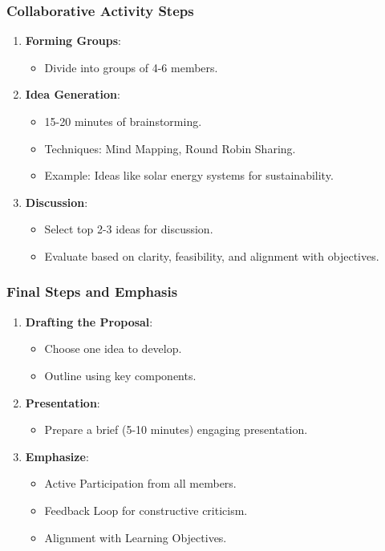 \documentclass[aspectratio=169]{beamer}
\begin{document}
\begin{frame}[fragile]
    \frametitle{Collaborative Activity Steps}
    \begin{enumerate}
        \item \textbf{Forming Groups}:
        \begin{itemize}
            \item Divide into groups of 4-6 members.
        \end{itemize}

        \item \textbf{Idea Generation}:
        \begin{itemize}
            \item 15-20 minutes of brainstorming.
            \item Techniques: Mind Mapping, Round Robin Sharing.
            \item Example: Ideas like solar energy systems for sustainability.
        \end{itemize}

        \item \textbf{Discussion}:
        \begin{itemize}
            \item Select top 2-3 ideas for discussion.
            \item Evaluate based on clarity, feasibility, and alignment with objectives.
        \end{itemize}
    \end{enumerate}
\end{frame}

\begin{frame}[fragile]
    \frametitle{Final Steps and Emphasis}
    \begin{enumerate}
        \item \textbf{Drafting the Proposal}:
        \begin{itemize}
            \item Choose one idea to develop.
            \item Outline using key components.
        \end{itemize}

        \item \textbf{Presentation}:
        \begin{itemize}
            \item Prepare a brief (5-10 minutes) engaging presentation.
        \end{itemize}

        \item \textbf{Emphasize}:
        \begin{itemize}
            \item Active Participation from all members.
            \item Feedback Loop for constructive criticism.
            \item Alignment with Learning Objectives.
        \end{itemize}
    \end{enumerate}
\end{frame}
\end{document}
